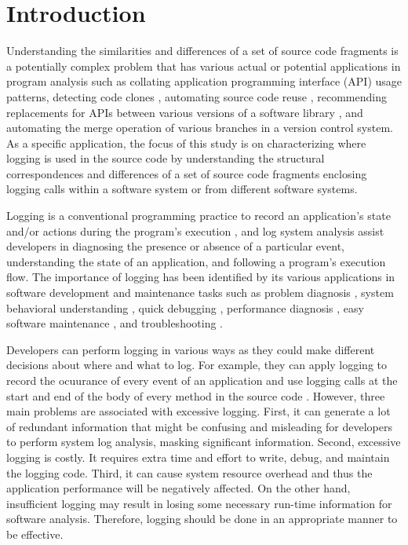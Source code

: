 
\chapter{Introduction}  \label{Introduction}

Understanding the similarities and differences of a set of source code fragments is a potentially complex problem that has various actual or potential applications in program analysis such as collating application programming interface (API) usage patterns, detecting code clones \cite{bulychev2009evaluation}, automating source code reuse \cite{cottrell2008semi}, recommending replacements for APIs between various versions of a software library \cite{cossette2014using}, and automating the merge operation of various branches in a version control system. As a specific application, the focus of this study is on characterizing where logging is used in the source code by understanding the structural correspondences and differences of a set of source code fragments enclosing logging calls within a software system or from different software systems.

Logging is a conventional programming practice to record an application's state and/or actions during the program's execution \cite{gupta2005pro}, and log system analysis assist developers in diagnosing the presence or absence of a particular event,  understanding the state of an application, and following a program’s execution flow. The importance of logging has been identified by its various applications in software development and maintenance tasks such as problem diagnosis \cite{lou2010mining}, system behavioral understanding \cite{fu2013contextual}, quick debugging \cite{gupta2005pro}, performance diagnosis \cite{nagaraj2012structured}, easy software maintenance \cite{gupta2005pro}, and troubleshooting \cite{fu2009execution}. 

Developers can perform logging in various ways as they could make different decisions about where and what to log. For example, they can apply logging to record the ocuurance of every event of an application and use logging calls at the start and end of the body of every method in the source code \cite{clarke1999dimension,clarke1999subject}. However, three main problems are associated with excessive logging. First, it can generate a lot of redundant information that might be confusing and misleading for developers to perform system log analysis, masking significant information. Second, excessive logging is costly. It requires extra time and effort to write, debug, and maintain the logging code. Third, it can cause system resource overhead and thus the application performance will be negatively affected. On the other hand, insufficient logging may result in losing some necessary run-time information for software analysis.
Therefore, logging should be done in an appropriate manner to be effective.

